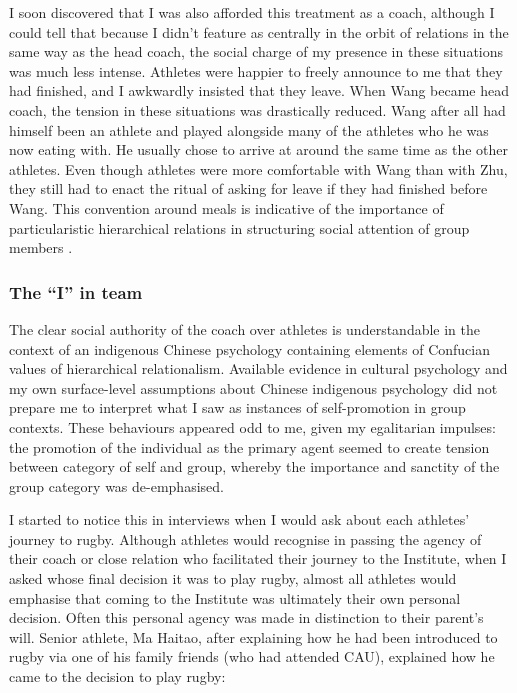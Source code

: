 \begin{CJK}{UTF8}{gbsn}
I soon discovered that I was also afforded this treatment as a coach, although I could tell that because I didn't feature as centrally in the orbit of relations in the same way as the head coach, the social charge of my presence in these situations was much less intense.  Athletes were happier to freely announce to me that they had finished, and I awkwardly insisted that they leave.  When Wang became head coach, the tension in these situations was drastically reduced. Wang after all had himself been an athlete and played alongside many of the athletes who he was now eating with.  He usually chose to arrive at around the same time as the other athletes.  Even though athletes were more comfortable with Wang than with Zhu, they still had to enact the ritual of asking for leave if they had finished before Wang.  This convention around meals is indicative of the importance of particularistic hierarchical relations in structuring social attention of group members \citep{Liu2009}.

\subsubsection{The ``I'' in team}
The clear social authority of the coach over athletes is understandable in the context of an indigenous Chinese psychology containing elements of Confucian values of hierarchical relationalism.
Available evidence in cultural psychology and my own surface-level assumptions about Chinese indigenous psychology did not prepare me to interpret what I saw as instances of self-promotion in group contexts.  These behaviours appeared odd to me, given my egalitarian impulses: the promotion of the individual as the primary agent seemed to create tension between category of self and group, whereby the importance and sanctity of the group category was de-emphasised.

I started to notice this in interviews when I would ask about each athletes' journey to rugby.  Although athletes would recognise in passing the agency of their coach or close relation who facilitated their journey to the Institute, when I asked whose final decision it was to play rugby, almost all athletes would emphasise that coming to the Institute was ultimately their own personal decision.  Often this personal agency was made in distinction to their parent's will.  Senior athlete, Ma Haitao, after explaining how he had been introduced to rugby via one of his family friends (who had attended CAU), explained how he came to the decision to play rugby:


\end{CJK}
